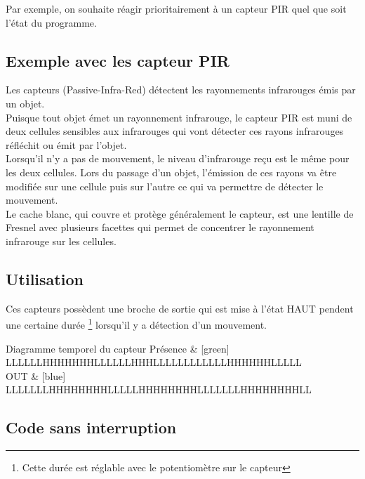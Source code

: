      Par exemple, on souhaite réagir prioritairement à un capteur PIR quel que soit l'état du programme.


     \subsection{Exemple avec les capteur PIR}
     
     Les capteurs  (Passive-Infra-Red) détectent les rayonnements infrarouges émis par un objet.\\
     Puisque tout objet émet un rayonnement infrarouge, le capteur PIR est muni de deux cellules sensibles aux infrarouges qui vont détecter ces rayons infrarouges réfléchit ou émit par l'objet. \\
     
     Lorsqu’il n’y a pas de mouvement, le niveau d’infrarouge reçu est le même pour les deux cellules. 
     Lors du passage d’un objet, l’émission de ces rayons va être modifiée sur une cellule puis sur l’autre ce qui va permettre de détecter le mouvement. \\
     
     Le cache blanc, qui couvre et protège généralement le capteur, est une lentille de Fresnel avec plusieurs facettes qui permet de concentrer le rayonnement infrarouge sur les cellules.
     
     \subsection{Utilisation}
     
     Ces capteurs possèdent une broche de sortie qui est mise à l'état HAUT pendent une certaine durée
     \footnote{Cette durée est réglable avec le potentiomètre sur le capteur} lorsqu'il y a détection d'un mouvement.\\
     
     
     \begin{numeric}{Diagramme temporel du capteur}
         Présence & [green] LLLLLLHHHHHHHLLLLLLHHHLLLLLLLLLLLLHHHHHHLLLLL \\
         OUT & [blue] LLLLLLLHHHHHHHHLLLLLHHHHHHHHLLLLLLLHHHHHHHHLL \\
     \end{numeric}
     
     
\subsection{Code sans interruption}

